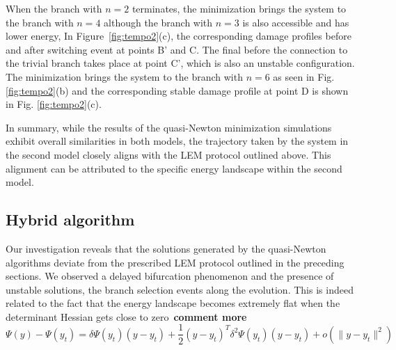When the branch with $n=2$ terminates, the minimization brings the system to the branch with $n=4$ although the branch with $n=3$ is also accessible and has lower energy, In Figure~\ref{fig:tempo2}(c), the corresponding damage profiles before and after  switching event  at points B' and C. The final  before the connection to the trivial branch takes place at point C', which is also an unstable configuration. The minimization brings the system to the branch with $n=6$ as seen in Fig. \ref{fig:tempo2}(b) and the corresponding stable damage profile at point D is shown in Fig. \ref{fig:tempo2}(c). 

In summary, while the results of the quasi-Newton minimization simulations exhibit overall similarities in both models, the trajectory taken by the system in the second model closely aligns with the LEM protocol outlined above. This alignment can be attributed to the specific energy landscape within the second model.


\subsection{Hybrid algorithm}
Our investigation reveals that the solutions generated by the quasi-Newton algorithms deviate from the prescribed LEM protocol outlined in the preceding sections. We observed a delayed bifurcation phenomenon and the presence of unstable solutions,  the branch selection events along the evolution.  This is indeed related to the fact that the energy landscape becomes extremely flat when the determinant Hessian gets close to zero~\textbf{comment more}
$$
\Psi(y)-\Psi(y_t)= \delta\Psi(y_t)(y-y_t)+\frac{1}{2}(y-y_t)^T \delta^2\Psi(y_t)(y-y_t)+o(\|y-y_t\|^2)
$$


